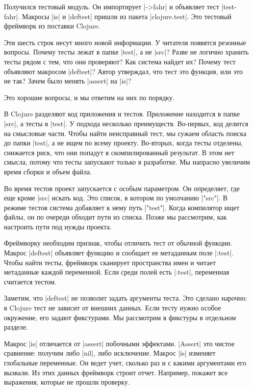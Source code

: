 Получился тестовый модуль. Он импортирует \spverb|->fahr| и объявляет тест
\spverb|test-fahr|. Макросы \spverb|is| и \spverb|deftest| пришли из пакета
\spverb|clojure.test|. Это тестовый фреймворк из поставки Clojure.

Эти шесть строк несут много новой информации. У читателя появятся резонные
вопросы. Почему тесты лежат в папке \spverb|test|, а не \spverb|src|? Разве не
логично хранить тесты рядом с тем, что они проверяют? Как система найдет их?
Почему тест объявляют макросом \spverb|deftest|? Автор утверждал, что тест это
функция, или это не так? Зачем было менять \spverb|assert| на \spverb|is|?

Это хорошие вопросы, и мы ответим на них по порядку.

В Clojure разделяют код приложения и тестов. Приложение находится в папке
\spverb|src|, а тесты в \spverb|test|. У подхода несколько
преимуществ. Во-первых, код делится на смысловые части. Чтобы найти неисправный
тест, мы сужаем область поиска до папки \spverb|test|, а не ищем по всему
проекту. Во-вторых, когда тесты отделены, снижается риск, что они попадут в
скомпилированный результат. В этом нет смысла, потому что тесты запускают только
в разработке. Мы напрасно увеличим время сборки и объем файла.

Во время тестов проект запускается с особым параметром. Он определяет, где еще
кроме \spverb|src| искать код. Это список, в котором по умолчанию
\spverb|"src"|. В режиме тестов система добавляет к нему путь
\spverb|"test"|. Когда компилятор ищет файлы, он по очереди обходит пути из
списка. Позже мы рассмотрим, как настроить пути под нужды проекта.

Фреймворку необходим признак, чтобы отличить тест от обычной функции. Макрос
\spverb|deftest| объявляет функцию и сообщает ее метаданным поле
\spverb|:test|. Чтобы найти тесты, фреймворк сканирует пространства имен и
читает метаданные каждой переменной. Если среди полей есть \spverb|:test|,
переменная считается тестом.

Заметим, что \spverb|deftest| не позволит задать аргументы теста. Это сделано
нарочно: в Clojure тест не зависит от внешних данных. Если тесту нужно особое
окружение, его задают фикстурами. Мы рассмотрим в фикстуры в отдельном разделе.

Макрос \spverb|is| отличается от \spverb|assert| побочными
эффектами. \spverb|Assert| это чистое сравнение: получим либо \spverb|nil|, либо
исключение. Макрос \spverb|is| изменяет глобальные переменные. Он ведет учет,
сколько раз и с какими аргументами его вызвали. Из этих данных фреймворк строит
отчет. Например, покажет все выражения, которые не прошли проверку.

